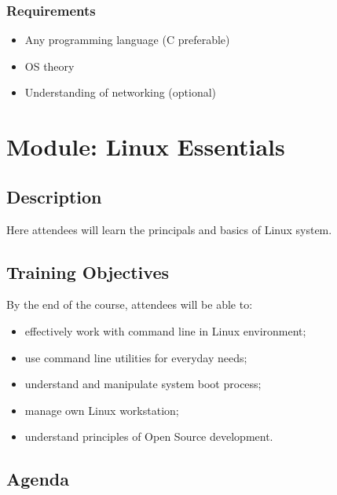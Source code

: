 \documentclass[12pt,a4paper,oneside]{article}
\begin{document}
\subsubsection{Requirements}
\begin{itemize}
	\item Any programming language (C preferable)
	\item OS theory
	\item Understanding of networking (optional)
\end{itemize}


\section{Module: Linux Essentials}

\subsection{Description}

Here attendees will learn the principals and basics of Linux system.

\subsection{Training Objectives}

By the end of the course,  attendees will be able to:
\begin{itemize}
	\item effectively work with command line in Linux environment;
	\item use command line utilities for everyday needs;
	\item understand and manipulate system boot process;
	\item manage own Linux workstation;
	\item understand principles of Open Source development.
\end{itemize}

\subsection{Agenda}
\end{document}
